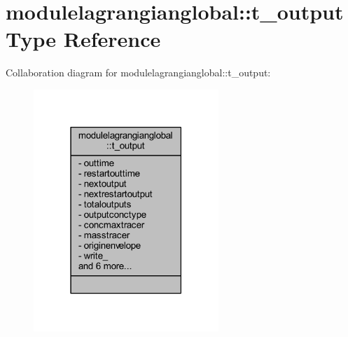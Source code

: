 \hypertarget{structmodulelagrangianglobal_1_1t__output}{}\section{modulelagrangianglobal\+:\+:t\+\_\+output Type Reference}
\label{structmodulelagrangianglobal_1_1t__output}


Collaboration diagram for modulelagrangianglobal\+:\+:t\+\_\+output\+:\nopagebreak
\begin{figure}[H]
\begin{center}
\leavevmode
\includegraphics[width=198pt]{structmodulelagrangianglobal_1_1t__output__coll__graph}
\end{center}
\end{figure}
